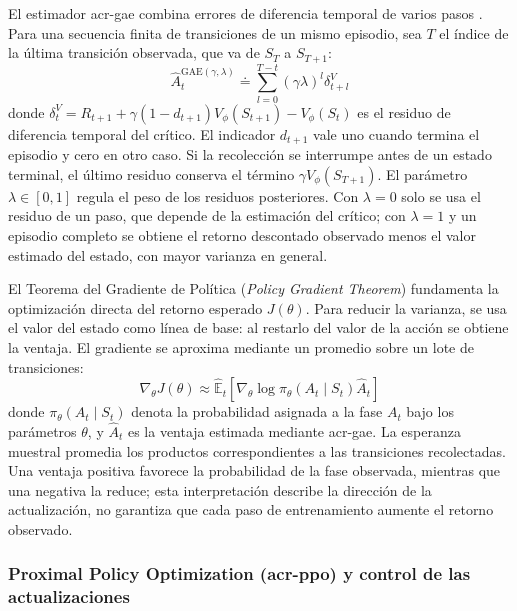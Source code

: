 El estimador \acrshort{acr-gae} combina errores de diferencia temporal de varios pasos \cite{schulman2015high}. Para una secuencia finita de transiciones de un mismo episodio, sea $T$ el índice de la última transición observada, que va de $S_T$ a $S_{T+1}$:
\begin{equation}
    \hat{A}_t^{\text{GAE}(\gamma, \lambda)} \doteq \sum_{l=0}^{T-t} (\gamma \lambda)^l \delta_{t+l}^V
    \label{eq:gae}
\end{equation}
donde $\delta_t^V=R_{t+1}+\gamma(1-d_{t+1})V_\phi(S_{t+1})-V_\phi(S_t)$ es el residuo de diferencia temporal del crítico. El indicador $d_{t+1}$ vale uno cuando termina el episodio y cero en otro caso. Si la recolección se interrumpe antes de un estado terminal, el último residuo conserva el término $\gamma V_\phi(S_{T+1})$. El parámetro $\lambda\in[0,1]$ regula el peso de los residuos posteriores. Con $\lambda=0$ solo se usa el residuo de un paso, que depende de la estimación del crítico; con $\lambda=1$ y un episodio completo se obtiene el retorno descontado observado menos el valor estimado del estado, con mayor varianza en general.

El Teorema del Gradiente de Política (\textit{Policy Gradient Theorem}) \cite{suttonRL} fundamenta la optimización directa del retorno esperado $J(\theta)$. Para reducir la varianza, se usa el valor del estado como línea de base: al restarlo del valor de la acción se obtiene la ventaja. El gradiente se aproxima mediante un promedio sobre un lote de transiciones:
\begin{equation}
    \nabla_\theta J(\theta) \approx \hat{\mathbb{E}}_t \left[ \nabla_\theta \log \pi_\theta(A_t \mid S_t) \hat{A}_t \right]
    \label{eq:gradiente_politica}
\end{equation}
donde $\pi_\theta(A_t \mid S_t)$ denota la probabilidad asignada a la fase $A_t$ bajo los parámetros $\theta$, y $\hat{A}_t$ es la ventaja estimada mediante \acrshort{acr-gae}. La esperanza muestral promedia los productos correspondientes a las transiciones recolectadas. Una ventaja positiva favorece la probabilidad de la fase observada, mientras que una negativa la reduce; esta interpretación describe la dirección de la actualización, no garantiza que cada paso de entrenamiento aumente el retorno observado.

\subsubsection[Proximal Policy Optimization (PPO)]{Proximal Policy Optimization (\acrshort{acr-ppo}) y control de las actualizaciones}

